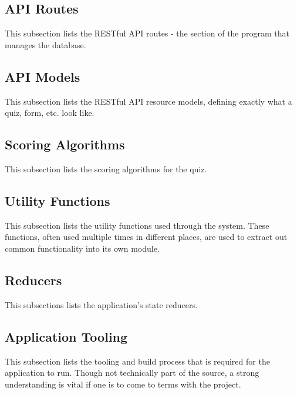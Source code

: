\subsection{API Routes} %
\label{sub:api_routes}
This subsection lists the RESTful API routes - the section of the program that manages the database.


\subsection{API Models} %
\label{sub:api_models}
This subsection lists the RESTful API resource models, defining exactly what a quiz, form, etc. look like.


\subsection{Scoring Algorithms} %
\label{sub:api_models}
This subsection lists the scoring algorithms for the quiz.


\subsection{Utility Functions} %
\label{sub:utility_functions}
This subsection lists the utility functions used through the system. These functions, often used multiple times in different places, are used to extract out common functionality into its own module.


\subsection{Reducers} %
\label{sub:reducers}
This subsections lists the application's state reducers.


\subsection{Application Tooling} %
\label{sub:api_models}
This subsection lists the tooling and build process that is required for the application to run. Though not technically part of the source, a strong understanding is vital if one is to come to terms with the project.

